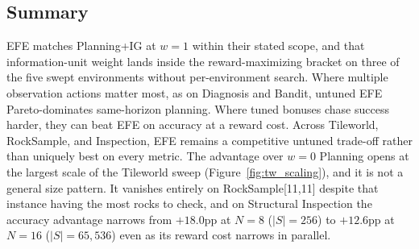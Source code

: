 \subsection{Summary}

EFE matches Planning+IG at $w{=}1$ within their stated scope, and that information-unit weight lands inside the reward-maximizing bracket on three of the five swept environments without per-environment search. Where multiple observation actions matter most, as on Diagnosis and Bandit, untuned EFE Pareto-dominates same-horizon planning. Where tuned bonuses chase success harder, they can beat EFE on accuracy at a reward cost. Across Tileworld, RockSample, and Inspection, EFE remains a competitive untuned trade-off rather than uniquely best on every metric. The advantage over $w{=}0$ Planning opens at the largest scale of the Tileworld sweep (Figure~\ref{fig:tw_scaling}), and it is not a general size pattern. It vanishes entirely on RockSample[11,11] despite that instance having the most rocks to check, and on Structural Inspection the accuracy advantage narrows from $+18.0$pp at $N{=}8$ ($|S|{=}256$) to $+12.6$pp at $N{=}16$ ($|S|{=}65{,}536$) even as its reward cost narrows in parallel.
